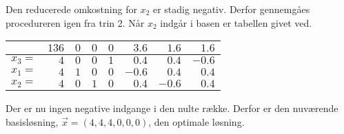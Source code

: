 \begin{eks}
Den reducerede omkostning for $x_2$ er stadig negativ. Derfor gennemgåes procedureren igen fra trin 2. Når $x_2$ indgår i basen er tabellen givet ved. 
\begin{center}
\begin{tabular}{r| r|r r r r r r|}
  \hline	
  &$136$&$0$ &$0$&$0$&$3.6$&$1.6$&$1.6$\\ \hline	
  $x_3=$&$4$&$0$&$0$&$1$&$0.4$&$0.4$&$-0.6$\\	
  $x_1=$&$4$&$1$&$0$&$0$&$-0.6$&$0.4$&$0.4$\\
  $x_2=$&$4$&$0$&$1$&$0$&$0.4$&$-0.6$&$0.4$\\
   \hline
\end{tabular}
\end{center}
Der er nu ingen negative indgange i den nulte række. Derfor er den nuværende basisløsning, $\vec{x}=(4,4,4,0,0,0)$, den optimale løsning. 
\end{eks}

